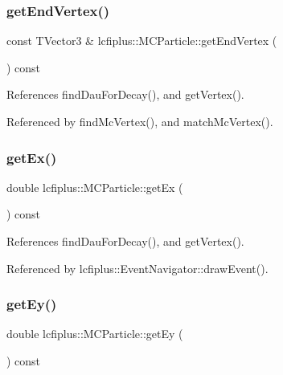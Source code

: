 \mbox{\label{classlcfiplus_1_1MCParticle_a3d7766d6e266186748722c8837c8e2d8}} 
\subsubsection{get\+End\+Vertex()}
{\footnotesize\ttfamily const T\+Vector3 \& lcfiplus\+::\+M\+C\+Particle\+::get\+End\+Vertex (\begin{DoxyParamCaption}{ }\end{DoxyParamCaption}) const}



References find\+Dau\+For\+Decay(), and get\+Vertex().



Referenced by find\+Mc\+Vertex(), and match\+Mc\+Vertex().

\mbox{\label{classlcfiplus_1_1MCParticle_a421de8d90097f2be79fc734a0013a2e1}} 
\subsubsection{get\+Ex()}
{\footnotesize\ttfamily double lcfiplus\+::\+M\+C\+Particle\+::get\+Ex (\begin{DoxyParamCaption}{ }\end{DoxyParamCaption}) const}



References find\+Dau\+For\+Decay(), and get\+Vertex().



Referenced by lcfiplus\+::\+Event\+Navigator\+::draw\+Event().

\mbox{\label{classlcfiplus_1_1MCParticle_a6dfe10cc1946158494d1b5aa455e4351}} 
\subsubsection{get\+Ey()}
{\footnotesize\ttfamily double lcfiplus\+::\+M\+C\+Particle\+::get\+Ey (\begin{DoxyParamCaption}{ }\end{DoxyParamCaption}) const}



